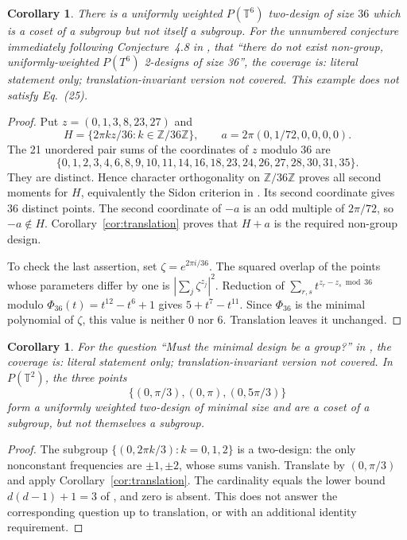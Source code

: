 \documentclass[11pt]{article}
\newtheorem{corollary}[theorem]{Corollary}
\newcommand{\T}{\mathbb T}
\begin{document}
\begin{corollary}\label{cor:six}
There is a uniformly weighted $P(\T^6)$ two-design of size $36$ which is a coset of a subgroup but not itself a subgroup. For the unnumbered conjecture immediately following Conjecture~4.8 in \cite[Section~4.3, p.~15]{iosue}, that ``there do not exist non-group, uniformly-weighted $P(T^6)$ 2-designs of size 36'', the coverage is: literal statement only; translation-invariant version not covered. This example does not satisfy Eq.~(25).
\end{corollary}
\begin{proof}
Put $z=(0,1,3,8,23,27)$ and
\[
H=\{2\pi k z/36:k\in\mathbb Z/36\mathbb Z\},\qquad
a=2\pi(0,1/72,0,0,0,0).
\]
The 21 unordered pair sums of the coordinates of $z$ modulo 36 are
\[
\{0,1,2,3,4,6,8,9,10,11,14,16,18,23,24,26,27,28,30,31,35\}.
\]
They are distinct. Hence character orthogonality on $\mathbb Z/36\mathbb Z$ proves all second moments for $H$, equivalently the Sidon criterion in \cite[Proposition~3.5]{iosue}. Its second coordinate gives 36 distinct points. The second coordinate of $-a$ is an odd multiple of $2\pi/72$, so $-a\notin H$. Corollary~\ref{cor:translation} proves that $H+a$ is the required non-group design.

To check the last assertion, set $\zeta=e^{2\pi i/36}$. The squared overlap of the points whose parameters differ by one is $|\sum_j\zeta^{z_j}|^2$. Reduction of $\sum_{r,s}t^{z_r-z_s\bmod36}$ modulo $\Phi_{36}(t)=t^{12}-t^6+1$ gives $5+t^7-t^{11}$. Since $\Phi_{36}$ is the minimal polynomial of $\zeta$, this value is neither 0 nor 6. Translation leaves it unchanged.
\end{proof}

\begin{corollary}\label{cor:minimal}
For the question ``Must the minimal design be a group?'' in \cite[Section~5, p.~16, ``Minimal projective toric designs'']{iosue}, the coverage is: literal statement only; translation-invariant version not covered. In $P(\T^2)$, the three points
\[
\{(0,\pi/3),(0,\pi),(0,5\pi/3)\}
\]
form a uniformly weighted two-design of minimal size and are a coset of a subgroup, but not themselves a subgroup.
\end{corollary}
\begin{proof}
The subgroup $\{(0,2\pi k/3):k=0,1,2\}$ is a two-design: the only nonconstant frequencies are $\pm1,\pm2$, whose sums vanish. Translate by $(0,\pi/3)$ and apply Corollary~\ref{cor:translation}. The cardinality equals the lower bound $d(d-1)+1=3$ of \cite[Proposition~2.13]{iosue}, and zero is absent. This does not answer the corresponding question up to translation, or with an additional identity requirement.
\end{proof}
\end{document}
